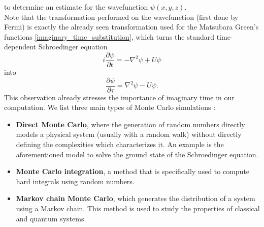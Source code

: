 to determine an estimate for the wavefunction $\psi(x,y,z)$.\\
Note that the transformation performed on the wavefunction (first done by Fermi) is exactly the already seen transformation used for the Matsubara Green's 
functions \ref{imaginary_time_substitution}, which turns the standard time-dependent Schroedinger equation
\begin{equation}
    i\frac{\partial \psi}{\partial t}=-\nabla^2\psi+U\psi
\end{equation}
into
\begin{equation}
    \frac{\partial\psi}{\partial \tau}=\nabla^2\psi-U\psi.
\end{equation}
This observation already stresses the importance of imaginary time in our computation.
We list three main types of Monte Carlo simulations \cite{thijssen2007computational}:
\begin{itemize}
    \item \textbf{Direct Monte Carlo}, where the generation of random numbers directly models a physical system (usually with a random walk) 
    without directly defining the complexities which characterizes it. An example is the aforementioned model to solve the ground state of 
    the Schroedinger equation.
    \item \textbf{Monte Carlo integration}, a method that is specifically used to compute hard integrals using random numbers.
    \item \textbf{Markov chain Monte Carlo}, which generates the distribution of a system using a Markov chain. This method is used to study the properties of classical and quantum systems.
\end{itemize}
